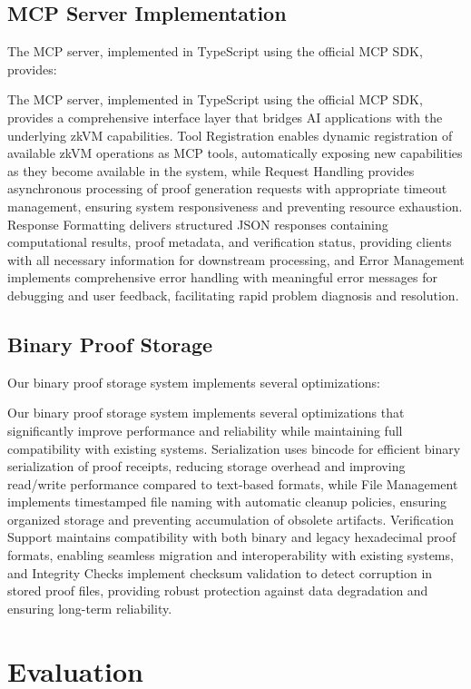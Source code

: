 \documentclass[11pt]{article}
\begin{document}
\subsection{MCP Server Implementation}

The MCP server, implemented in TypeScript using the official MCP SDK, provides:

The MCP server, implemented in TypeScript using the official MCP SDK, provides a comprehensive interface layer that bridges AI applications with the underlying zkVM capabilities. Tool Registration enables dynamic registration of available zkVM operations as MCP tools, automatically exposing new capabilities as they become available in the system, while Request Handling provides asynchronous processing of proof generation requests with appropriate timeout management, ensuring system responsiveness and preventing resource exhaustion. Response Formatting delivers structured JSON responses containing computational results, proof metadata, and verification status, providing clients with all necessary information for downstream processing, and Error Management implements comprehensive error handling with meaningful error messages for debugging and user feedback, facilitating rapid problem diagnosis and resolution.

\subsection{Binary Proof Storage}

Our binary proof storage system implements several optimizations:

Our binary proof storage system implements several optimizations that significantly improve performance and reliability while maintaining full compatibility with existing systems. Serialization uses bincode for efficient binary serialization of proof receipts, reducing storage overhead and improving read/write performance compared to text-based formats, while File Management implements timestamped file naming with automatic cleanup policies, ensuring organized storage and preventing accumulation of obsolete artifacts. Verification Support maintains compatibility with both binary and legacy hexadecimal proof formats, enabling seamless migration and interoperability with existing systems, and Integrity Checks implement checksum validation to detect corruption in stored proof files, providing robust protection against data degradation and ensuring long-term reliability.

\section{Evaluation}
\label{sec:evaluation}
\end{document}
